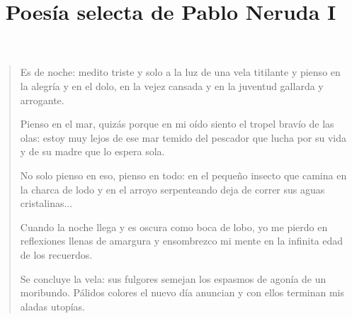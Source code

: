 \documentclass[12pt]{article}
\date{}
\title{Poesía selecta de Pablo Neruda I}
\begin{document}
\maketitle
\tableofcontents

\clearpage
{}
\begin{verse}
Es de noche: medito triste y solo  
a la luz de una vela titilante  
y pienso en la alegría y en el dolo,  
en la vejez cansada  
y en la juventud gallarda y arrogante.  
	
Pienso en el mar, quizás porque en mi oído  
siento el tropel bravío de las olas:  
estoy muy lejos de ese mar temido  
del pescador que lucha por su vida  
y de su madre que lo espera sola.  
	
No solo pienso en eso, pienso en todo:  
en el pequeño insecto que camina  
en la charca de lodo  
y en el arroyo serpenteando deja de correr sus aguas cristalinas...  
	
Cuando la noche llega y es oscura  
como boca de lobo, yo me pierdo  
en reflexiones llenas de amargura  
y ensombrezco mi mente  
en la infinita edad de los recuerdos.  
	
Se concluye la vela: sus fulgores  
semejan los espasmos de agonía  
de un moribundo. Pálidos colores  
el nuevo día anuncian y con ellos  
terminan mis aladas utopías.

\end{verse}
\end{document}
